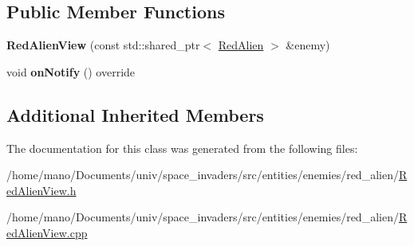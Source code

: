 \subsection*{Public Member Functions}
\begin{DoxyCompactItemize}
\item 
\mbox{\label{classentities_1_1enemies_1_1red__alien_1_1RedAlienView_a291f78b84b87557b59bcf98d2cef95a6}} 
{\bfseries Red\+Alien\+View} (const std\+::shared\+\_\+ptr$<$ \hyperlink{classentities_1_1enemies_1_1red__alien_1_1RedAlien}{Red\+Alien} $>$ \&enemy)
\item 
\mbox{\label{classentities_1_1enemies_1_1red__alien_1_1RedAlienView_abddf987c883563442aa29a5bebfdfe9b}} 
void {\bfseries on\+Notify} () override
\end{DoxyCompactItemize}
\subsection*{Additional Inherited Members}


The documentation for this class was generated from the following files\+:\begin{DoxyCompactItemize}
\item 
/home/mano/\+Documents/univ/space\+\_\+invaders/src/entities/enemies/red\+\_\+alien/\hyperlink{RedAlienView_8h}{Red\+Alien\+View.\+h}\item 
/home/mano/\+Documents/univ/space\+\_\+invaders/src/entities/enemies/red\+\_\+alien/\hyperlink{RedAlienView_8cpp}{Red\+Alien\+View.\+cpp}\end{DoxyCompactItemize}
